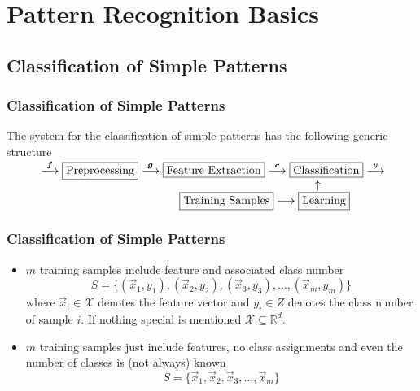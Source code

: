 \section{Pattern Recognition Basics}

\subsection{Classification of Simple Patterns}

\begin{frame}
	\frametitle{Classification of Simple Patterns}

	The system for the classification of simple patterns has the following generic structure\\
	\vspace{2cm}
	\pause
	$\hspace{1.03cm} \overset{\vec f}{\longrightarrow}\fbox{Preprocessing}\overset{\vec g}{\longrightarrow}\fbox{Feature Extraction} \overset{\vec c}{\longrightarrow}\fbox{Classification} \overset{y}{\longrightarrow}$\\
	$\hspace{1.03cm}\hspace{8.5cm} \uparrow $\\
	$\hspace{1.03cm}\hspace{4.3cm} \fbox{Training Samples}\longrightarrow \fbox{Learning}$
\end{frame}

\begin{frame}
	\frametitle{Classification of Simple Patterns \cont}

	\begin{itemize}
		\item {\em {}}

		      $m$ training samples include feature and associated class number
		      \begin{displaymath}
			      S = \{ (\vec x_1, y_1), (\vec x_2, y_2), (\vec x_3, y_3), \dots, (\vec x_m, y_m) \}
		      \end{displaymath}
              where $\vec x_i \in \mathcal{X}$ denotes the feature vector and $y_i\in Z$ denotes the class number of sample $i$.
	      If nothing special is mentioned ${\mathcal{X}}\subseteq \mathbb{R}^d$.
		      \pause
		      \vspace{0.5cm}
		\item {\em {}}

		      $m$ training samples just include features, no class assignments and even the number of classes is (not always) known
		      \begin{displaymath}
			      S = \{ \vec x_1, \vec x_2, \vec x_3, \dots, \vec x_m \}
		      \end{displaymath}
	\end{itemize}
\end{frame}


